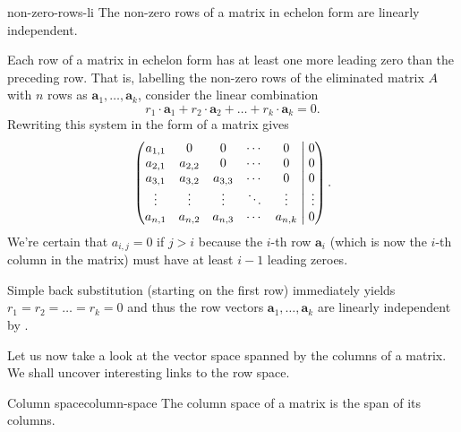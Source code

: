 \begin{lemma}{}{non-zero-rows-li}
 The non-zero rows of a matrix in echelon form are linearly independent.
\end{lemma}
\begin{lemproof}
 Each row of a matrix in echelon form has at least one more leading zero than
 the preceding row. That is, labelling the non-zero rows of the eliminated
 matrix $A$ with $n$ rows as $\mathbf{a}_1,\ldots,\mathbf{a}_k$, consider the
 linear combination
 \[
  r_1 \cdot \mathbf{a}_1 + r_2 \cdot \mathbf{a}_2 + \ldots + r_k \cdot
  \mathbf{a}_k = 0.
 \]
 Rewriting this system in the form of a matrix gives
 \[
  \left(
   \begin{matrix*}[c]
    a_{1,1} & 0 & 0 & \cdots & 0\\
    a_{2,1} & a_{2,2} & 0 & \cdots & 0\\
    a_{3,1} & a_{3,2} & a_{3,3} & \cdots & 0\\
    \vdots & \vdots & \vdots & \ddots & \vdots\\
    a_{n,1} & a_{n,2} & a_{n,3} & \cdots & a_{n,k}
   \end{matrix*}
   \hspace{1mm}
  \right|
  \left.
   \begin{matrix*}[r]
    0\\
    0\\
    0\\
    \vdots\\
    0
   \end{matrix*}
  \right).
 \]
 We're certain that $a_{i,j} = 0$ if $j > i$ because the $i$-th row
 $\mathbf{a}_i$ (which is now the $i$-th column in the matrix) must have at
 least $i - 1$ leading zeroes.

 Simple back substitution (starting on the first row) immediately yields $r_1 =
 r_2 = \ldots = r_k = 0$ and thus the row vectors
 $\mathbf{a}_1,\ldots,\mathbf{a}_k$ are linearly independent by
 .
\end{lemproof}

Let us now take a look at the vector space spanned by the columns of a matrix.
We shall uncover interesting links to the row space.

\begin{definition}{Column space}{column-space}
 The column space of a matrix is the span of its columns.
\end{definition}

